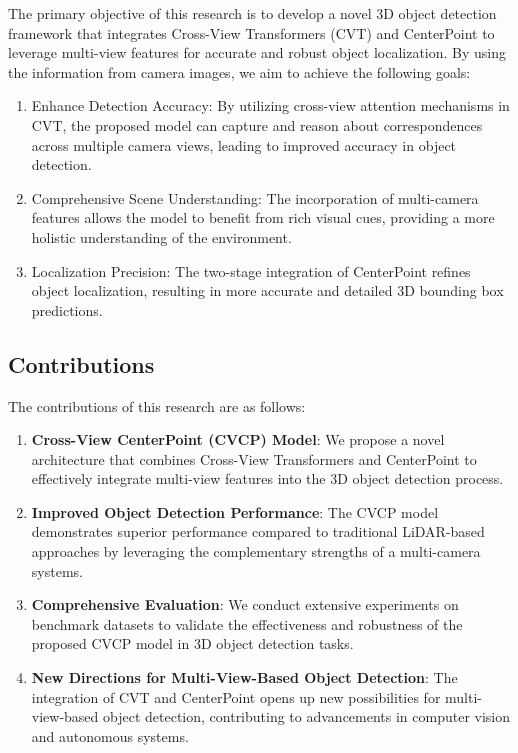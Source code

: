 \documentclass[twocolumn, times]{article}
\begin{document}
The primary objective of this research is to develop a novel 3D object detection framework that integrates Cross-View Transformers (CVT) and CenterPoint to leverage multi-view features for accurate and robust object localization. By using the information from camera images, we aim to achieve the following goals:

\begin{enumerate}
    \item Enhance Detection Accuracy: By utilizing cross-view attention mechanisms in CVT, the proposed model can capture and reason about correspondences across multiple camera views, leading to improved accuracy in object detection.
    \item Comprehensive Scene Understanding: The incorporation of multi-camera features allows the model to benefit from rich visual cues, providing a more holistic understanding of the environment.
    \item Localization Precision: The two-stage integration of CenterPoint refines object localization, resulting in more accurate and detailed 3D bounding box predictions.
\end{enumerate}

\subsection{Contributions}

The contributions of this research are as follows:

\begin{enumerate}
    \item \textbf{Cross-View CenterPoint (CVCP) Model}: We propose a novel architecture that combines Cross-View Transformers and CenterPoint to effectively integrate multi-view features into the 3D object detection process.
    \item \textbf{Improved Object Detection Performance}: The CVCP model demonstrates superior performance compared to traditional LiDAR-based approaches by leveraging the complementary strengths of a multi-camera systems.
    \item \textbf{Comprehensive Evaluation}: We conduct extensive experiments on benchmark datasets to validate the effectiveness and robustness of the proposed CVCP model in 3D object detection tasks.
    \item \textbf{New Directions for Multi-View-Based Object Detection}: The integration of CVT and CenterPoint opens up new possibilities for multi-view-based object detection, contributing to advancements in computer vision and autonomous systems.
\end{enumerate}
\end{document}
